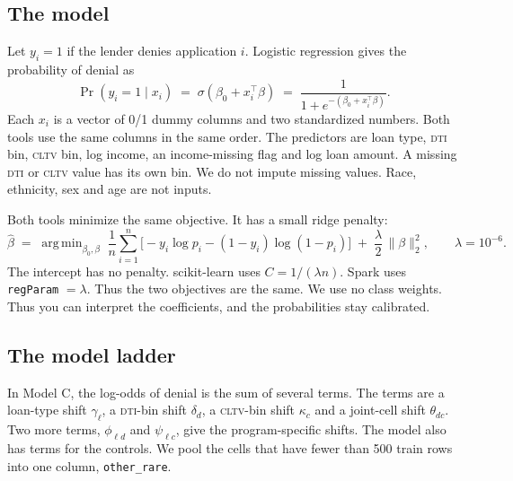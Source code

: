 \documentclass[11pt,a4paper]{article}
\newcommand{\DTI}{\textsc{dti}}
\newcommand{\CLTV}{\textsc{cltv}}
\newcommand{\code}[1]{\texttt{\small #1}}
\newcommand{\pr}{\operatorname{Pr}}
\DeclareMathOperator*{\argmin}{arg\,min}
\begin{document}
\subsection{The model}
Let $y_i = 1$ if the lender denies application $i$.
Logistic regression gives the probability of denial as
\begin{equation}
  \pr(y_i = 1 \mid x_i) \;=\; \sigma(\beta_0 + x_i^{\top}\beta) \;=\; \frac{1}{1 + e^{-(\beta_0 + x_i^{\top}\beta)}} .
  \label{eq:logit}
\end{equation}
Each $x_i$ is a vector of 0/1 dummy columns and two standardized numbers.
Both tools use the same columns in the same order.
The predictors are loan type, \DTI{} bin, \CLTV{} bin, log income, an income-missing flag and log loan amount.
A missing \DTI{} or \CLTV{} value has its own bin.
We do not impute missing values.
Race, ethnicity, sex and age are not inputs.

Both tools minimize the same objective.
It has a small ridge penalty:
\begin{equation}
  \hat\beta \;=\; \argmin_{\beta_0,\beta}\; \frac{1}{n}\sum_{i=1}^{n}\Big[-y_i\log p_i-(1-y_i)\log(1-p_i)\Big] \;+\; \frac{\lambda}{2}\,\lVert\beta\rVert_2^{2},
  \qquad \lambda = 10^{-6}.
  \label{eq:objective}
\end{equation}
The intercept has no penalty.
scikit-learn uses $C = 1/(\lambda n)$.
Spark uses \code{regParam} $=\lambda$.
Thus the two objectives are the same.
We use no class weights.
Thus you can interpret the coefficients, and the probabilities stay calibrated.

\subsection{The model ladder}
\begin{table}[H]
  \centering
  \small
  
  \caption{Model ladder. Model A is the baseline. Model B adds the \DTI{}$\times$\CLTV{} cross. Model C lets the \DTI{} and \CLTV{} effects change for each program. Models D, E and F are sensitivity tests with finer \DTI{} bins, state dummies, and no rows with a \CLTV{} above 150. Model G is a gradient-boosted tree model that shows if the logistic features miss structure.}
  \label{tab:ladder}
\end{table}

In Model C, the log-odds of denial is the sum of several terms.
The terms are a loan-type shift $\gamma_\ell$, a \DTI{}-bin shift $\delta_d$, a \CLTV{}-bin shift $\kappa_c$ and a joint-cell shift $\theta_{dc}$.
Two more terms, $\phi_{\ell d}$ and $\psi_{\ell c}$, give the program-specific shifts.
The model also has terms for the controls.
We pool the cells that have fewer than 500 train rows into one column, \code{other\_rare}.
\end{document}
